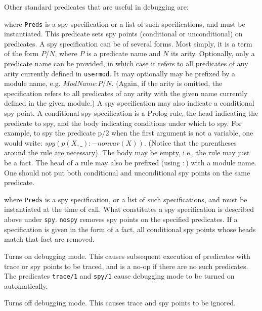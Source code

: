 Other standard predicates that are useful in debugging are:

\begin{description}
 
    where {\tt Preds} is a spy specification or a list of such
    specifications, and must be instantiated. This predicate sets spy
    points (conditional or unconditional) on predicates.  A spy
    specification can be of several forms. Most simply, it is a term
    of the form $P$/$N$, where $P$ is a predicate name and $N$ its
    arity.  Optionally, only a predicate name can be provided, in
    which case it refers to all predicates of any arity currently
    defined in {\tt usermod}.  It may optionally may be prefixed by a
    module name, e.g.  $ModName$:$P$/$N$. (Again, if the arity is
    omitted, the specification refers to all predicates of any arity
    with the given name currently defined in the given module.)  A spy
    specification may also indicate a conditional spy point. A
    conditional spy specification is a Prolog rule, the head
    indicating the predicate to spy, and the body indicating
    conditions under which to spy. For example, to spy the predicate
    p/2 when the first argument is not a variable, one would write:
    $spy (p(X,\_):-nonvar(X)).$ (Notice that the parentheses around
    the rule are necessary). The body may be empty, i.e., the rule may
    just be a fact.  The head of a rule may also be prefixed (using
    $:$) with a module name. One should not put both conditional and
    unconditional spy points on the same predicate.

 
    where {\tt Preds} is a spy specification, or a list of such
    specifications, and must be instantiated at the time of call.  What
    constitutes a spy specification is described above under {\tt spy}.
    {\tt nospy} removes spy points on the specified predicates. If a
    specification is given in the form of a fact, all conditional spy points
    whose heads match that fact are removed.

  
    Turns on debugging mode.
    This causes subsequent execution of predicates with trace or spy
    points to be traced, and is a no-op if there are no such predicates.
    The predicates {\tt trace/1} and {\tt spy/1} cause debugging mode
    to be turned on automatically.

 
    Turns off debugging mode.  This causes trace and spy points to be ignored.


\end{description}
